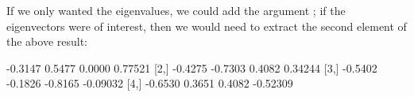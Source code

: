 If we only wanted the eigenvalues, we could add the argument ; if the eigenvectors were of interest, then we would need to extract the second element of the above result: 

\begin{Schunk}
\begin{Soutput}
        [,1]    [,2]    [,3]     [,4]
[1,] -0.3147  0.5477  0.0000  0.77521
[2,] -0.4275 -0.7303  0.4082  0.34244
[3,] -0.5402 -0.1826 -0.8165 -0.09032
[4,] -0.6530  0.3651  0.4082 -0.52309
\end{Soutput}
\end{Schunk}

